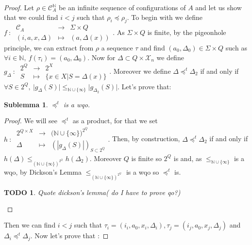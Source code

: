 \documentclass[a4paper,10pt]{report}
\newtheorem{slm}{Sublemma}[lm]
\newtheorem{td}{TODO}
\newcommand{\dmap}[5]{
#1~:~\begin{array}{ccccc}
#2 &\to& #3 \\
#4  &\mapsto& #5
\end{array}}
\newcommand{\C}{\mathcal{C}_{A}}
\newcommand{\X}{\mathcal{X}_{n}}
\begin{document}
\begin {proof}
Let $\rho \in \C^{\mathbb N}$ be an infinite sequence of configurations of $A$ and let us show that we could find $i < j$ such that $\rho_i \preceq \rho_j$.
To begin with we define
$\dmap{f}{\C}{\Sigma \times Q}{(i,a,x,\Delta)}{(a,\Delta(x))}$.
As $\Sigma \times Q$ is finite, by the pigeonhole principle, we can extract from $\rho$ a sequence $\tau$ and find $(a_0,\Delta_0) \in \Sigma \times Q$ such as 
$\forall i \in \mathbb N,\ f(\tau_i)=(a_0,\Delta_0)$.
Now for $\Delta \subset Q \times \X $ we define $\dmap{g_\Delta}{2^Q}{2^X}{S}{\{ x \in X | S=\Delta(x) \}} .$
Moreover we define $\Delta \preceq^t \Delta_2$ if and only if $\forall S \in 2^Q,\ \lvert g_\Delta(S) \lvert \leq_{\mathbb N \cup \{\infty\}} \lvert g_{\Delta_2}(S) \lvert$. Let's prove that: 
\begin{slm}
  $\preceq^t$ is a wqo.
\end{slm}
\begin{proof}
We will see $\preceq^t$ as a product, for that we set $ \dmap{h}{2^{Q\times X}}{({\mathbb N \cup \{\infty\})}^{2^Q}}{\Delta}{(|g_{\Delta}(S)|)_{S\subset {2^Q} }}.$
Then, by construction, $\Delta \preceq^t \Delta_2$ if and only if $ h(\Delta) \leq_{{(\mathbb N \cup \{\infty\})}^{2^Q}} h(\Delta_2)$.
Moreover $Q$ is finite so $2^Q$ is and, as $\leq_{\mathbb N \cup \{\infty\}}$ is a wqo, by Dickson's Lemma $\leq_{{(\mathbb N \cup \{\infty\})}^{2^Q}}$
is a wqo so $\preceq^t$ is.
\begin{td}
  Quote dickson's lemma( do I have to prove qo?) 
\end{td}
\end{proof}
Then we can find $i < j$ such that $\tau_i=(i_i,a_0,x_i,\Delta_i), \tau_j=(i_j,a_0,x_j,\Delta_j)$ and $\Delta_i \preceq^t \Delta_j$.
Now let's prove that :


\end{proof}
\end{document}

